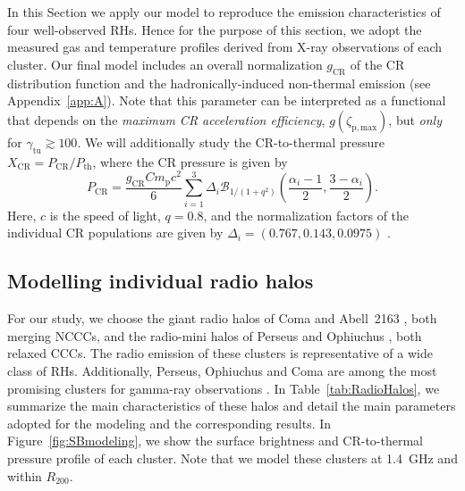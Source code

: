 \documentclass[traditabstract]{aa}
\newcommand{\rmn}{\mathrm}
\begin{document}
In this Section we apply our model to reproduce the emission characteristics of
four well-observed RHs. Hence for the purpose of this section, we adopt the
measured gas and temperature profiles derived from X-ray observations of each cluster.  Our
final model includes an overall normalization $g_{\rmn{CR}}$ of the CR
distribution function and the hadronically-induced non-thermal emission 
(see Appendix~\ref{app:A}). Note that
this parameter can be interpreted as a functional that depends on the
\emph{maximum CR acceleration efficiency}, $g(\zeta_{\rmn{p,max}})$,
\citep{2010MNRAS.409..449P} but \emph{only} for
$\gamma_{\rmn{tu}}\gtrsim100$. We will additionally study the CR-to-thermal
pressure $X_{\rmn{CR}}=P_{\rmn{CR}}/P_{\rmn{th}}$, where the CR pressure is
given by
\begin{equation}
  \label{eq:PCR}
  P_{\rmn{CR}}=\frac{g_{\rmn{CR}} C m_{\rmn{p}} c^{2}}{6}
  \sum_{i=1}^{3} \Delta_{i} \mathcal{B}_{1/(1+q^2)} \left(
    \frac{\alpha_{i}-1}{2},\frac{3-\alpha_{i}}{2} \right).
\end{equation}
Here, $c$ is the speed of light, $q=0.8$, and the normalization factors of the
individual CR populations are given by $\Delta_{i} = (0.767, 0.143, 0.0975)$
\citep[][see also Appendix~\ref{app:A}]{2010MNRAS.409..449P}. 


\subsection{Modelling individual radio halos}

For our study, we choose the giant radio halos of Coma
\citep{1997A&A...321...55D} and Abell~2163
\citep{2001A&A...373..106F,2009A&A...499..679M}, both merging NCCCs, and the
radio-mini halos of Perseus \citep{1990MNRAS.246..477P} and Ophiuchus
\citep{2009A&A...499..371G,2009A&A...499..679M}, both relaxed CCCs. The radio
emission of these clusters is representative of a wide class of RHs.
Additionally, Perseus, Ophiuchus and Coma are among the most promising clusters
for gamma-ray observations \citep{2010MNRAS.409..449P,2011arXiv1105.3240P}. In
Table~\ref{tab:RadioHalos}, we summarize the main characteristics of these halos
and detail the main parameters adopted for the modeling and the corresponding
results. In Figure~\ref{fig:SBmodeling}, we show the surface brightness and
CR-to-thermal pressure profile of each cluster. Note that we model these
clusters at 1.4~GHz and within $R_{200}$.
\end{document}
